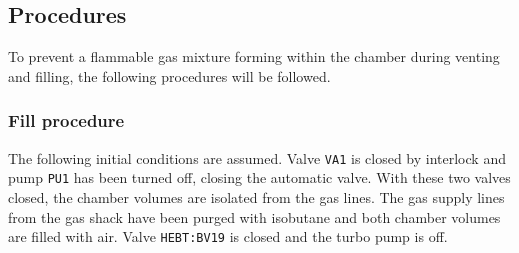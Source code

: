 \subsection{Procedures}
\label{procedures}
To prevent a flammable gas mixture forming within the chamber during venting and filling,
the following procedures will be followed.
\subsubsection{Fill procedure}
The following initial conditions are assumed.  Valve \texttt{VA1} is closed by interlock and pump \texttt{PU1} has been turned off, closing the automatic valve.  With these two valves closed, the chamber volumes are isolated from the gas lines.  The gas supply lines from the gas shack have been purged with isobutane and both chamber volumes are filled with air.  Valve  \texttt{HEBT:BV19} is closed and the turbo pump is off. 
